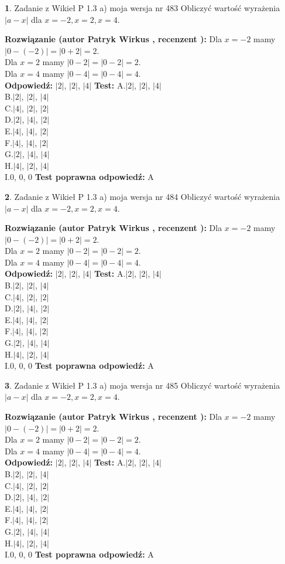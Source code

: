 \documentclass[12pt, a4paper]{article}
\theoremstyle{definition} %
\newtheorem{zad}{}
\newcommand{\zadStart}[1]{\begin{zad}#1\newline}
\newcommand{\zadStop}{\end{zad}}
\newcommand{\rozwStart}[2]{\noindent \textbf{Rozwiązanie (autor #1 , recenzent #2): }\newline}
\newcommand{\rozwStop}{\newline}
\newcommand{\odpStart}{\noindent \textbf{Odpowiedź:}\newline}
\newcommand{\odpStop}{\newline}
\newcommand{\testStart}{\noindent \textbf{Test:}\newline}
\newcommand{\testStop}{\newline}
\newcommand{\kluczStart}{\noindent \textbf{Test poprawna odpowiedź:}\newline}
\newcommand{\kluczStop}{\newline}
\begin{document}
\zadStart{Zadanie z Wikieł P 1.3 a) moja wersja nr 483}
Obliczyć wartość wyrażenia $|a - x|$ dla $x=-2,x=2,x=4$.
\zadStop
\rozwStart{Patryk Wirkus}{}
Dla $x = -2$ mamy $|0 - (-2)| = |0 + 2| = 2$.\\
Dla $x = 2$ mamy $|0 - 2| = |0 - 2| = 2$.\\
Dla $x = 4$ mamy $|0 - 4| = |0 - 4| = 4$.\\
\rozwStop
\odpStart
$|2|$, $|2|$, $|4|$
\odpStop
\testStart
A.$|2|$, $|2|$, $|4|$\\
B.$|2|$, $|2|$, $|4|$\\
C.$|4|$, $|2|$, $|2|$\\
D.$|2|$, $|4|$, $|2|$\\
E.$|4|$, $|4|$, $|2|$\\
F.$|4|$, $|4|$, $|2|$\\
G.$|2|$, $|4|$, $|4|$\\
H.$|4|$, $|2|$, $|4|$\\
I.$0$, $0$, $0$
\testStop
\kluczStart
A
\kluczStop



\zadStart{Zadanie z Wikieł P 1.3 a) moja wersja nr 484}
Obliczyć wartość wyrażenia $|a - x|$ dla $x=-2,x=2,x=4$.
\zadStop
\rozwStart{Patryk Wirkus}{}
Dla $x = -2$ mamy $|0 - (-2)| = |0 + 2| = 2$.\\
Dla $x = 2$ mamy $|0 - 2| = |0 - 2| = 2$.\\
Dla $x = 4$ mamy $|0 - 4| = |0 - 4| = 4$.\\
\rozwStop
\odpStart
$|2|$, $|2|$, $|4|$
\odpStop
\testStart
A.$|2|$, $|2|$, $|4|$\\
B.$|2|$, $|2|$, $|4|$\\
C.$|4|$, $|2|$, $|2|$\\
D.$|2|$, $|4|$, $|2|$\\
E.$|4|$, $|4|$, $|2|$\\
F.$|4|$, $|4|$, $|2|$\\
G.$|2|$, $|4|$, $|4|$\\
H.$|4|$, $|2|$, $|4|$\\
I.$0$, $0$, $0$
\testStop
\kluczStart
A
\kluczStop



\zadStart{Zadanie z Wikieł P 1.3 a) moja wersja nr 485}
Obliczyć wartość wyrażenia $|a - x|$ dla $x=-2,x=2,x=4$.
\zadStop
\rozwStart{Patryk Wirkus}{}
Dla $x = -2$ mamy $|0 - (-2)| = |0 + 2| = 2$.\\
Dla $x = 2$ mamy $|0 - 2| = |0 - 2| = 2$.\\
Dla $x = 4$ mamy $|0 - 4| = |0 - 4| = 4$.\\
\rozwStop
\odpStart
$|2|$, $|2|$, $|4|$
\odpStop
\testStart
A.$|2|$, $|2|$, $|4|$\\
B.$|2|$, $|2|$, $|4|$\\
C.$|4|$, $|2|$, $|2|$\\
D.$|2|$, $|4|$, $|2|$\\
E.$|4|$, $|4|$, $|2|$\\
F.$|4|$, $|4|$, $|2|$\\
G.$|2|$, $|4|$, $|4|$\\
H.$|4|$, $|2|$, $|4|$\\
I.$0$, $0$, $0$
\testStop
\kluczStart
A
\kluczStop
\end{document}
